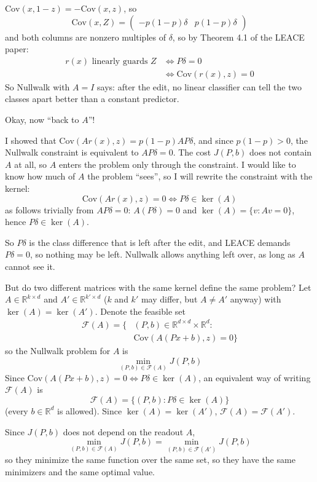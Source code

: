 \documentclass[10pt,a4paper,twocolumn]{article}
\newcommand{\R}{\mathbb{R}}
\begin{document}
	$\mathrm{Cov}(x, 1 - z) = - \mathrm{Cov}(x, z)$, so
	$$\mathrm{Cov}(x, Z) = \begin{pmatrix} - p (1 - p) \delta & p (1 - p) \delta \end{pmatrix}$$
	and both columns are nonzero multiples of $\delta$, so by Theorem 4.1 of the LEACE paper:
	$$\begin{aligned}
		r(x) \text{ linearly guards } Z & \iff P \delta = 0 \\
		& \iff \mathrm{Cov}(r(x), z) = 0
	\end{aligned}$$
	So Nullwalk with $A = I$ says: after the edit, no linear classifier can tell the two classes apart better than a constant predictor.

	Okay, now ``back to $A$''!

	I showed that $\mathrm{Cov}(A r(x), z) = p (1 - p) A P \delta$, and since $p (1 - p) > 0$, the Nullwalk constraint is equivalent to $A P \delta = 0$. The cost $J(P, b)$ does not contain $A$ at all, so $A$ enters the problem only through the constraint. I would like to know how much of $A$ the problem ``sees'', so I will rewrite the constraint with the kernel:
	$$\mathrm{Cov}(A r(x), z) = 0 \iff P \delta \in \ker(A)$$
	as follows trivially from $A P \delta = 0$: $A (P \delta) = 0$ and $\ker(A) = \{ v : A v = 0 \}$, hence $P \delta \in \ker(A)$.

	So $P \delta$ is the class difference that is left after the edit, and LEACE demands $P \delta = 0$, so nothing may be left. Nullwalk allows anything left over, as long as $A$ cannot see it.

	But do two different matrices with the same kernel define the same problem? Let $A \in \R^{k \times d}$ and $A' \in \R^{k' \times d}$ ($k$ and $k'$ may differ, but $A \ne A'$ anyway) with $\ker(A) = \ker(A')$. Denote the feasible set
	$$\begin{aligned}
		\mathcal{F}(A) = \{ & (P, b) \in \R^{d \times d} \times \R^d : \\
		& \mathrm{Cov}(A (P x + b), z) = 0 \}
	\end{aligned}$$
	so the Nullwalk problem for $A$ is
	$$\min_{(P, b) \in \mathcal{F}(A)} J(P, b)$$
	Since $\mathrm{Cov}(A (P x + b), z) = 0 \iff P \delta \in \ker(A)$, an equivalent way of writing $\mathcal{F}(A)$ is
	$$\mathcal{F}(A) = \{ (P, b) : P \delta \in \ker(A) \}$$
	(every $b \in \R^d$ is allowed). Since $\ker(A) = \ker(A')$, $\mathcal{F}(A) = \mathcal{F}(A')$.

	Since $J(P, b)$ does not depend on the readout $A$,
	$$\min_{(P, b) \in \mathcal{F}(A)} J(P, b) = \min_{(P, b) \in \mathcal{F}(A')} J(P, b)$$
	so they minimize the same function over the same set, so they have the same minimizers and the same optimal value.
\end{document}
